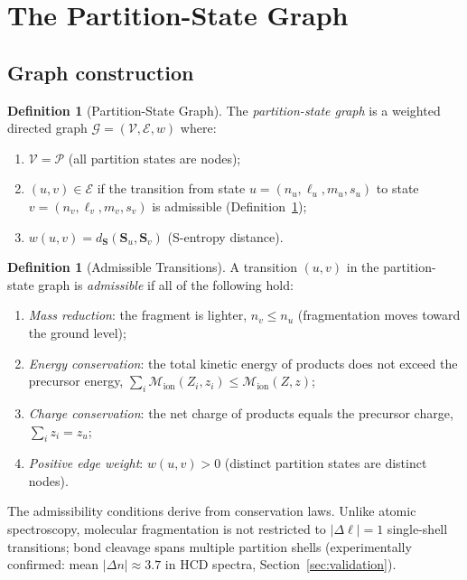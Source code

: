 \documentclass[twocolumn,10pt,a4paper]{article}
\theoremstyle{thmstyle}
\theoremstyle{definition}
\newtheorem{definition}[theorem]{Definition}
\theoremstyle{remark}
\newcommand{\Parts}{\mathcal{P}}
\newcommand{\Sv}{\mathbf{S}}
\newcommand{\Mop}{\mathcal{M}}
\newcommand{\calG}{\mathcal{G}}
\newcommand{\calV}{\mathcal{V}}
\newcommand{\calE}{\mathcal{E}}
\begin{document}
\section{The Partition-State Graph}
\label{sec:graph}

\subsection{Graph construction}

\begin{definition}[Partition-State Graph]
\label{def:graph}
The \emph{partition-state graph} is a weighted directed graph
$\calG = (\calV, \calE, w)$ where:
\begin{enumerate}[nosep,label=(\roman*)]
\item $\calV = \Parts$ (all partition states are nodes);
\item $(u, v) \in \calE$ if the transition from state $u = (n_u,\ell_u,m_u,s_u)$
  to state $v = (n_v,\ell_v,m_v,s_v)$ is admissible
  (Definition~\ref{def:admissible});
\item $w(u,v) = d_{\Sv}(\Sv_u, \Sv_v)$ (S-entropy distance).
\end{enumerate}
\end{definition}

\begin{definition}[Admissible Transitions]
\label{def:admissible}
A transition $(u, v)$ in the partition-state graph is \emph{admissible}
if all of the following hold:
\begin{enumerate}[nosep,label=(\roman*)]
\item \emph{Mass reduction}: the fragment is lighter, $n_v \leq n_u$
  (fragmentation moves toward the ground level);
\item \emph{Energy conservation}: the total kinetic energy of products
  does not exceed the precursor energy,
  $\sum_i \Mop_\text{ion}(Z_i, z_i) \leq \Mop_\text{ion}(Z, z)$;
\item \emph{Charge conservation}: the net charge of products equals the
  precursor charge, $\sum_i z_i = z_u$;
\item \emph{Positive edge weight}: $w(u,v) > 0$ (distinct partition
  states are distinct nodes).
\end{enumerate}
\end{definition}

The admissibility conditions derive from conservation laws. Unlike
atomic spectroscopy, molecular fragmentation is not restricted to
$|\Delta\ell| = 1$ single-shell transitions; bond cleavage spans
multiple partition shells (experimentally confirmed: mean $|\Delta n|
\approx 3.7$ in HCD spectra, Section~\ref{sec:validation}).
\end{document}
